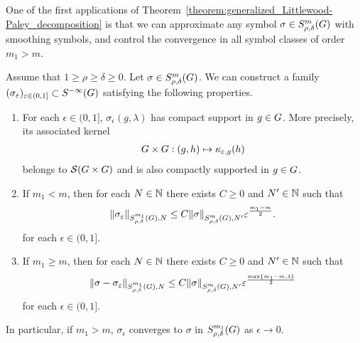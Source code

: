 One of the first applications of Theorem~\ref{theorem:generalized_Littlewood-Paley_decomposition}
is that we can approximate any symbol $\sigma \in \SymbolClass m {\rho, \delta}$ with smoothing symbols,
and control the convergence in all symbol classes of order $m_1 > m$.

\begin{proposition}
\label{proposition:approximation_of_symbols}
    Assume that $1 \geq \rho \geq \delta \geq 0$.
    Let $\sigma \in \SymbolClass m {\rho, \delta}$.
    We can construct a family $(\sigma_\epsilon)_{\epsilon \in (0, 1]} \subset \SmoothingSymbols$ satisfying the following properties.
    \begin{enumerate}
        \item For each $\epsilon \in (0, 1]$,
            $\sigma_\epsilon(g, \lambda)$ has compact support in $g \in \Group$.
            More precisely, its associated kernel
            \begin{align*}
                \Group \times \Group : (g, h) \mapsto \kappa_{\epsilon, g}(h)
            \end{align*}
            belongs to $\Schwartz {\Group \times \Group}$ and is also compactly supported in $g \in \Group$.
        \item If $m_1 < m$, then for each $N \in \N$ there exists $C \geq 0$ and $N' \in \N$ such that
            \begin{align*}
                \SymbolSemiNorm {m_1} {\rho, \delta} N {\sigma_\epsilon}
                \leq C \SymbolSemiNorm m {\rho, \delta} {N'} \sigma
                \epsilon^\frac {m_1 - m} 2.
            \end{align*}
            for each $\epsilon \in (0, 1]$.
        \item If $m_1 \geq m$, then for each $N \in \N$ there exists $C \geq 0$ and $N' \in \N$ such that
            \begin{align*}
                \SymbolSemiNorm {m_1} {\rho, \delta} N {\sigma - \sigma_\epsilon}
                \leq C \SymbolSemiNorm m {\rho, \delta} {N'} \sigma
                \epsilon^\frac {\max \{m_1 - m, 4\}} 2
            \end{align*}
            for each $\epsilon \in (0, 1]$.
    \end{enumerate}

    In particular, if $m_1 > m$, $\sigma_\epsilon$ converges to $\sigma$ in $\SymbolClass {m_1} {\rho, \delta}$ as $\epsilon \to 0$.
\end{proposition}
